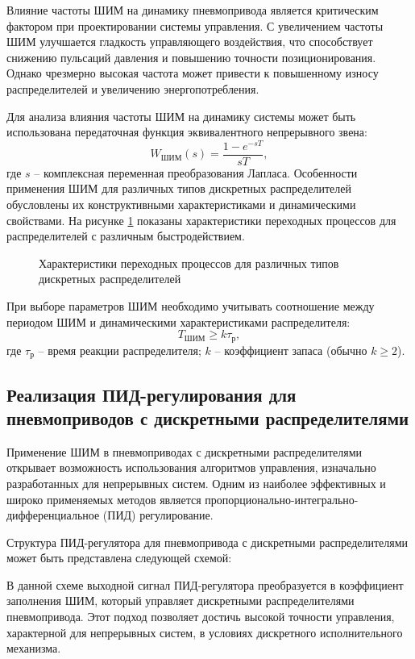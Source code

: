 Влияние частоты ШИМ на динамику пневмопривода является критическим фактором при
проектировании системы управления. С увеличением частоты ШИМ улучшается
гладкость управляющего воздействия, что способствует снижению пульсаций давления
и повышению точности позиционирования. Однако чрезмерно высокая частота может привести
к повышенному износу распределителей и увеличению энергопотребления.

Для анализа влияния частоты ШИМ на динамику системы может быть использована передаточная функция эквивалентного непрерывного звена:
\begin{equation*}
	W_{\text{ШИМ}}(s) = \frac{1 - e^{-sT}}{sT},
\end{equation*}
где $s$ -- комплексная переменная преобразования Лапласа.
Особенности применения ШИМ для различных типов дискретных
распределителей обусловлены их конструктивными характеристиками и
динамическими свойствами. На рисунке \ref{fig:ch3:pwm_valve_response} показаны
характеристики переходных процессов для распределителей с различным быстродействием.

\begin{figure}[ht]
	\caption{Характеристики переходных процессов для различных типов дискретных распределителей}
	\label{fig:ch3:pwm_valve_response}
\end{figure}

При выборе параметров ШИМ необходимо учитывать соотношение между
периодом ШИМ и динамическими характеристиками распределителя:
\begin{equation*}
	T_{ШИМ} \geq k\tau_{\text{р}},
\end{equation*}
где $\tau_{\text{р}}$ -- время реакции распределителя;
$k$ -- коэффициент запаса (обычно $k \geq 2$).

\subsection{Реализация ПИД-регулирования для пневмоприводов с дискретными распределителями}\label{subsec:ch3/sec2/sub2}
Применение ШИМ в пневмоприводах с дискретными распределителями открывает
возможность использования алгоритмов управления,
изначально разработанных для непрерывных систем.
Одним из наиболее эффективных и широко применяемых методов является
пропорционально-интегрально-дифференциальное (ПИД) регулирование.

Структура ПИД-регулятора для пневмопривода
с дискретными распределителями может быть представлена следующей схемой:
\begin{figure}[ht]
	\label{fig:ch3:pid_pwm_control}
\end{figure}
В данной схеме выходной сигнал ПИД-регулятора преобразуется в коэффициент
заполнения ШИМ, который управляет дискретными распределителями
пневмопривода. Этот подход позволяет достичь высокой точности
управления, характерной для непрерывных систем, в условиях
дискретного исполнительного механизма.

